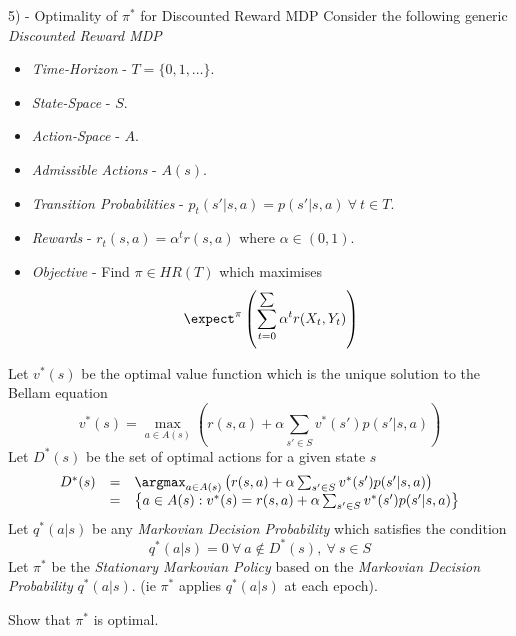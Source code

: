 \documentclass[11pt,a4paper]{article}
\begin{document}
\begin{question}{5) - Optimality of $\pi^*$ for Discounted Reward MDP}
  Consider the following generic \textit{Discounted Reward MDP}
  \begin{itemize}
    \item \textit{Time-Horizon} - $T=\{0,1,\dots\}$.
    \item \textit{State-Space} - $S$.
    \item \textit{Action-Space} - $A$.
    \item \textit{Admissible Actions} - $A(s)$.
    \item \textit{Transition Probabilities} - $p_t(s'|s,a)=p(s'|s,a)\ \forall\ t\in T$.
    \item \textit{Rewards} - $r_t(s,a)=\alpha^tr(s,a)$ where $\alpha\in(0,1)$.
    \item \textit{Objective} - Find $\pi\in HR(T)$ which maximises
    \[ \expect^\pi\left(\sum_{t=0}^\sum\alpha^tr(X_t,Y_t)\right) \]
  \end{itemize}
  Let $v^*(s)$ be the optimal value function which is the unique solution to the Bellam equation
  \[ v^*(s)=\max_{a\in A(s)}\left(r(s,a)+\alpha\sum_{s'\in S}v^*(s')p(s'|s,a)\right) \]
  Let $D^*(s)$ be the set of optimal actions for a given state $s$
  \[\begin{array}{rcl}
    D^*(s)&=&\argmax_{a\in A(s)}\left(r(s,a)+\alpha\sum_{s'\in S}v^*(s')p(s'|s,a)\right)\\
    &=&\left\{a\in A(s):v^*(s)=r(s,a)+\alpha\sum_{s'\in S}v^*(s')p(s'|s,a)\right\}
  \end{array}\]
  Let $q^*(a|s)$ be any \textit{Markovian Decision Probability} which satisfies the condition
  \[ q^*(a|s)=0\ \forall\ a\not\in D^*(s),\ \forall\ s\in S \]
  Let $\pi^*$ be the \textit{Stationary Markovian Policy} based on the \textit{Markovian Decision Probability} $q^*(a|s)$. (ie $\pi^*$ applies $q^*(a|s)$ at each epoch).
  \par Show that $\pi^*$ is optimal.
\end{question}
\end{document}
